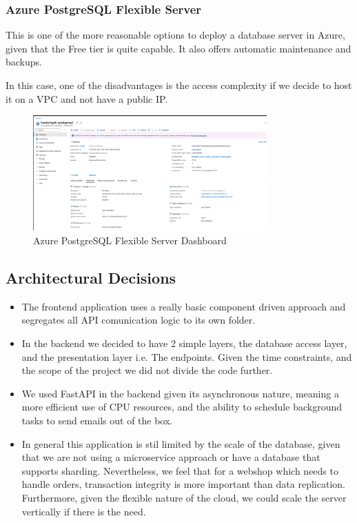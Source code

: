 \documentclass{llncs}
\begin{document}
\subsubsection{Azure PostgreSQL Flexible Server}

This is one of the more reasonable options to deploy a database server in Azure, given that the Free tier is quite capable. It also offers automatic maintenance and backups.

In this case, one of the disadvantages is the access complexity if we decide to host it on a VPC and not have a public IP.\\

\begin{figure}[H]
    \centering
    \includegraphics[width=0.8\textwidth]{../images/database_azure.png}
    \vspace{0.01\textwidth}
    \caption{Azure PostgreSQL Flexible Server Dashboard}
    \label{fig:database_azure}
\end{figure}


\subsection{Architectural Decisions}

\begin{itemize}
    \item The frontend application uses a really basic component driven approach and segregates all API comunication logic to its own folder.
    \item In the backend we decided to have 2 simple layers, the database access layer, and the presentation layer i.e. The endpoints.
          Given the time constraints, and the scope of the project we did not divide the code further.
    \item We used FastAPI in the backend given its asynchronous nature, meaning a more efficient use of CPU resources, and the ability to schedule background tasks to send emails out of the box.
    \item In general this application is stil limited by the scale of the database, given that we are not using a microservice approach or have a database that supports sharding.
          Nevertheless, we feel that for a webshop which needs to handle orders, transaction integrity is more important than data replication. Furthermore, given the flexible nature of the cloud, we could scale the server vertically if there is the need.

\end{itemize}
\end{document}
